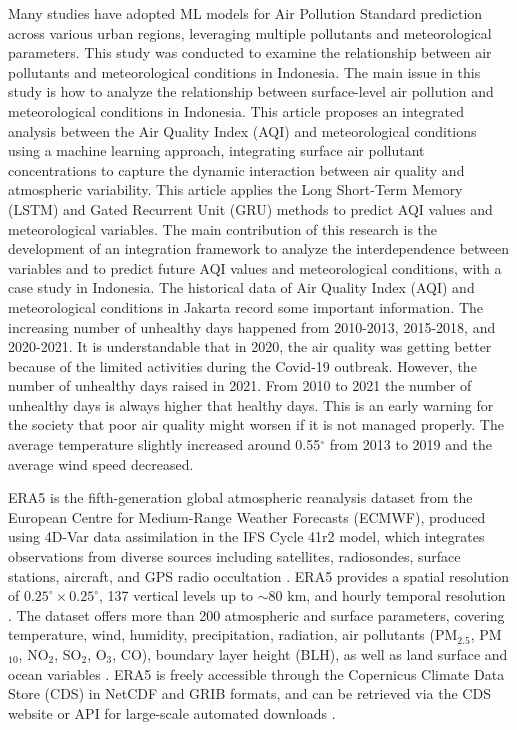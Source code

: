 \documentclass[review,12pt]{elsarticle}
\begin{document}
	Many studies have adopted ML models for Air Pollution Standard prediction across various urban regions, leveraging multiple pollutants and meteorological parameters.
	This study was conducted to examine the relationship between air pollutants and meteorological conditions in Indonesia. The main issue in this study is how to analyze the relationship between surface-level air pollution and meteorological conditions in Indonesia. This article proposes an integrated analysis between the Air Quality Index (AQI) and meteorological conditions using a machine learning approach, integrating surface air pollutant concentrations to capture the dynamic interaction between air quality and atmospheric variability. This article applies the Long Short-Term Memory (LSTM) and Gated Recurrent Unit (GRU) methods to predict AQI values and meteorological variables. The main contribution of this research is the development of an integration framework to analyze the interdependence between variables and to predict future AQI values and meteorological conditions, with a case study in Indonesia.
	The historical data of Air Quality Index (AQI) and meteorological conditions in Jakarta record some important information. The increasing number of unhealthy days happened from 2010-2013, 2015-2018, and 2020-2021. It is understandable that in 2020, the air quality was getting better because of the limited activities during the Covid-19 outbreak. However, the number of unhealthy days raised in 2021. From 2010 to 2021 the number of unhealthy days is always higher that healthy days. This is an early warning for the society that poor air quality might worsen if it is not managed properly. The average temperature slightly increased around 0.55$^\circ$ from 2013 to 2019 and the average wind speed decreased.

ERA5 is the fifth-generation global atmospheric reanalysis dataset from the European Centre for Medium-Range Weather Forecasts (ECMWF), produced using 4D-Var data assimilation in the IFS Cycle 41r2 model, which integrates observations from diverse sources including satellites, radiosondes, surface stations, aircraft, and GPS radio occultation \cite{hersbach2020, copernicus2023}. ERA5 provides a spatial resolution of $0.25^\circ \times 0.25^\circ$, 137 vertical levels up to $\sim$80 km, and hourly temporal resolution \cite{hersbach2020}. The dataset offers more than 200 atmospheric and surface parameters, covering temperature, wind, humidity, precipitation, radiation, air pollutants (PM$_{2.5}$, PM$_{10}$, NO$_2$, SO$_2$, O$_3$, CO), boundary layer height (BLH), as well as land surface and ocean variables \cite{hersbach2020, bell2021}. ERA5 is freely accessible through the Copernicus Climate Data Store (CDS) in NetCDF and GRIB formats, and can be retrieved via the CDS website or API for large-scale automated downloads \cite{copernicus2023}.
\end{document}
